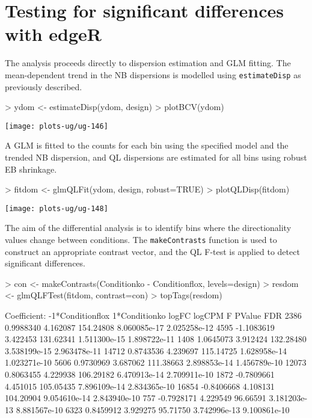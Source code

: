 \documentclass[12pt]{report}
\renewenvironment{Schunk}{\vspace{0pt}}{\vspace{0pt}}
\newcommand{\edgeR}{edgeR}
\newcommand{\code}[1]{{\small\texttt{#1}}}
\begin{document}
\section{Testing for significant differences with \edgeR{}}
The analysis proceeds directly to dispersion estimation and GLM fitting.
The mean-dependent trend in the NB dispersions is modelled using \code{estimateDisp} as previously described.

\begin{Schunk}
\begin{Sinput}
> ydom <- estimateDisp(ydom, design)
> plotBCV(ydom)
\end{Sinput}
\end{Schunk}

\begin{center}
\texttt{[image: plots-ug/ug-146]}
\end{center}

A GLM is fitted to the counts for each bin using the specified model and the trended NB dispersion, and QL dispersions are estimated for all bins using robust EB shrinkage.

\begin{Schunk}
\begin{Sinput}
> fitdom <- glmQLFit(ydom, design, robust=TRUE)
> plotQLDisp(fitdom)
\end{Sinput}
\end{Schunk}

\begin{center}
\texttt{[image: plots-ug/ug-148]}
\end{center}


The aim of the differential analysis is to identify bins where the directionality values change between conditions.
The \code{makeContrasts} function is used to construct an appropriate contrast vector, and the QL F-test is applied to detect significant differences.

\begin{Schunk}
\begin{Sinput}
> con <- makeContrasts(Conditionko - Conditionflox, levels=design)
> resdom <- glmQLFTest(fitdom, contrast=con)
> topTags(resdom)
\end{Sinput}
\begin{Soutput}
Coefficient:  -1*Conditionflox 1*Conditionko 
           logFC   logCPM         F       PValue          FDR
2386   0.9988340 4.162087 154.24808 8.060085e-17 2.025258e-12
4595  -1.1083619 3.422453 131.62341 1.511300e-15 1.898722e-11
1408   1.0645073 3.912424 132.28480 3.538199e-15 2.963478e-11
14712  0.8743536 4.239697 115.14725 1.628958e-14 1.023271e-10
5606   0.9730969 3.687062 111.38663 2.898853e-14 1.456789e-10
12073  0.8063455 4.229938 106.29182 6.470913e-14 2.709911e-10
1872  -0.7809661 4.451015 105.05435 7.896109e-14 2.834365e-10
16854 -0.8406668 4.108131 104.20904 9.054610e-14 2.843940e-10
757   -0.7928171 4.229549  96.66591 3.181203e-13 8.881567e-10
6323   0.8459912 3.929275  95.71750 3.742996e-13 9.100861e-10
\end{Soutput}
\end{Schunk}
\end{document}
